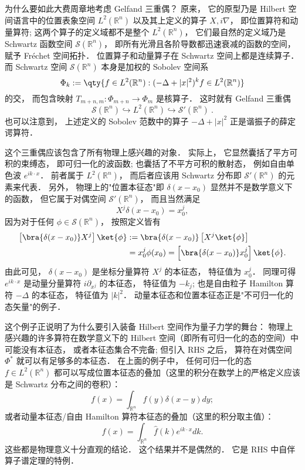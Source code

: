     为什么要如此大费周章地考虑 Gelfand 三重偶？ 原来， 它的原型乃是 Hilbert 空间语言中的位置表象空间 $L^2(\mathbb{R}^n)$ 以及其上定义的算子 $X,i\nabla$， 即位置算符和动量算符; 这两个算子的定义域都不是整个 $L^2(\mathbb{R}^n)$， 它们最自然的定义域乃是 Schwartz 函数空间 $\mathcal{S}(\mathbb{R}^n)$， 即所有光滑且各阶导数都迅速衰减的函数的空间， 赋予 Fréchet 空间拓扑． 位置算子和动量算子在 Schwartz 空间上都是连续算子． 而 Schwartz 空间 $\mathcal{S}(\mathbb{R}^n)$ 本身是加权的 Sobolev 空间系
$$
\Phi_k := \qty{f \in L^2 (\mathbb{R}^n): (-\Delta + |x|^ 2)^{k} f \in L^2 (\mathbb{R}^n) }
$$
的交， 而包含映射 $T_{m+n,m}:\Phi_{m+n}\to\Phi_m$ 是核算子． 这时就有 Gelfand 三重偶$$
\mathcal{S}(\mathbb{R}^n)\hookrightarrow L^2(\mathbb{R}^n)\hookrightarrow \mathcal{S}'(\mathbb{R}^n)~.
$$也可以注意到， 上述定义的 Sobolev 范数中的算子 $-\Delta+|x|^2$ 正是谐振子的薛定谔算符．

    这个三重偶应该包含了所有物理上感兴趣的对象． 实际上， 它显然囊括了平方可积的束缚态， 即可归一化的波函数; 也囊括了不平方可积的散射态， 例如自由单色波 $e^{ik\cdot x}$． 前者属于 $L^2(\mathbb{R}^n)$， 而后者应该用 Schwartz 分布即 $\mathcal{S}'(\mathbb{R}^n)$ 的元素来代表． 另外， 物理上的"位置本征态"即 $\delta(x-x_0)$ 显然并不是数学意义下的函数， 但它属于对偶空间 $\mathcal{S}'(\mathbb{R}^n)$， 而且当然满足
$$
X^j\delta(x-x_0)=x_0^j,
$$
因为对于任何 $\phi\in\mathcal{S}(\mathbb{R}^n)$， 按照定义皆有
$$
\begin{aligned}
\left[\bra{\delta(x-x_0)}X^j\right]\ket{\phi}
&:=\bra{\delta(x-x_0)}\left[X^j\ket{\phi}\right]\\
&=x_0^j\phi(x_0)
=\left[\bra{\delta(x-x_0)}x_0^j\right]\ket{\phi}.
\end{aligned}
$$
由此可见， $\delta(x-x_0)$ 是坐标分量算符 $X^j$ 的本征态， 特征值为 $x_0^j$． 同理可得 $e^{ik\cdot x}$ 是动量分量算符 $i\partial_{x^j}$ 的本征态， 特征值为 $-k_j$; 也是自由粒子 Hamilton 算符 $-\Delta$ 的本征态， 特征值为 $|k|^2$． 动量本征态和位置本征态正是"不可归一化的态矢量"的例子． 

    这个例子正说明了为什么要引入装备 Hilbert 空间作为量子力学的舞台： 物理上感兴趣的许多算符在数学意义下的 Hilbert 空间（即所有可归一化的态的空间）中可能没有本征态， 或者本征态集合不完备; 但引入 RHS 之后， 算符在对偶空间 $\Phi^*$ 就可以有足够多的本征态． 在上面的例子中， 任何可归一化的态 $f\in{L^2}(\mathbb{R}^n)$ 都可以写成位置本征态的叠加（这里的积分在数学上的严格定义应该是 Schwartz 分布之间的卷积）：
$$
f(x)=\int_{\mathbb{R}^n}f(y)\delta(x-y)dy;
$$    
或者动量本征态/自由 Hamilton 算符本征态的叠加（这里的积分取主值）：
$$
f(x)=\int_{\mathbb{R}^n}\hat f(k)e^{ik\cdot x}dk.
$$
这些都是物理意义十分直观的结论． 这个结果并不是偶然的． 它是 RHS 中自伴算子谱定理的特例．
